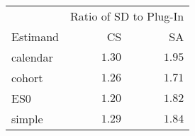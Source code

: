 \captionsetup[table]{labelformat=empty,skip=1pt}
\begin{longtable}{lrr}
\toprule
 & \multicolumn{2}{c}{Ratio of SD to Plug-In} \\ 
 \cmidrule(lr){2-3}
Estimand & CS & SA \\ 
\midrule
calendar & $1.30$ & $1.95$ \\ 
cohort & $1.26$ & $1.71$ \\ 
ES0 & $1.20$ & $1.82$ \\ 
simple & $1.29$ & $1.84$ \\ 
 \bottomrule
\end{longtable}

